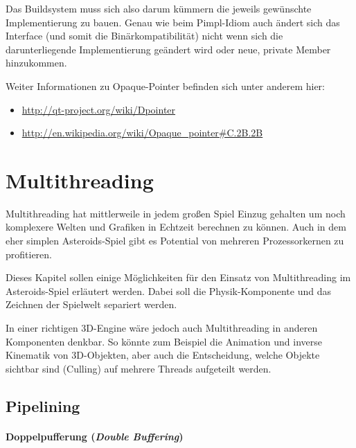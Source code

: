 \documentclass[12pt, a4paper, titlepage, hidelinks]{scrreprt}
\begin{document}
Das Buildsystem muss sich also darum kümmern die jeweils gewünschte Implementierung zu bauen. Genau wie beim Pimpl-Idiom auch ändert sich das Interface (und somit die Binärkompatibilität) nicht wenn sich die darunterliegende Implementierung geändert wird oder neue, private Member hinzukommen.

Weiter Informationen zu Opaque-Pointer befinden sich unter anderem hier:
\begin{itemize}
\item \url{http://qt-project.org/wiki/Dpointer}
\item \url{http://en.wikipedia.org/wiki/Opaque_pointer#C.2B.2B}
\end{itemize}

\section{Multithreading}

Multithreading hat mittlerweile in jedem großen Spiel Einzug gehalten um noch komplexere Welten und Grafiken in Echtzeit berechnen zu können. Auch in dem eher simplen Asteroids-Spiel gibt es Potential von mehreren Prozessorkernen zu profitieren.

Dieses Kapitel sollen einige Möglichkeiten für den Einsatz von Multithreading im Asteroids-Spiel erläutert werden. Dabei soll die Physik-Komponente und das Zeichnen der Spielwelt separiert werden.

In einer richtigen 3D-Engine wäre jedoch auch Multithreading in anderen Komponenten denkbar. So könnte zum Beispiel die Animation und inverse Kinematik von 3D-Objekten, aber auch die Entscheidung, welche Objekte sichtbar sind (Culling) auf mehrere Threads aufgeteilt werden.

\subsection{Pipelining}

\paragraph{Doppelpufferung (\textit{Double Buffering})}
\end{document}
